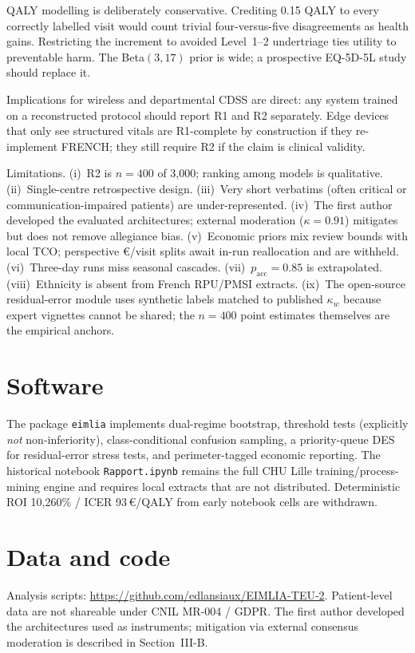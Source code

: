 \documentclass[conference]{IEEEtran}
\begin{document}
QALY modelling is deliberately conservative. Crediting 0.15 QALY to every correctly labelled visit would count trivial four-versus-five disagreements as health gains. Restricting the increment to avoided Level~1--2 undertriage ties utility to preventable harm. The Beta$(3,17)$ prior is wide; a prospective EQ-5D-5L study should replace it.

Implications for wireless and departmental CDSS are direct: any system trained on a reconstructed protocol should report R1 and R2 separately. Edge devices that only see structured vitals are R1-complete by construction if they re-implement FRENCH; they still require R2 if the claim is clinical validity.

Limitations. (i)~R2 is $n=400$ of 3{,}000; ranking among models is qualitative. (ii)~Single-centre retrospective design. (iii)~Very short verbatims (often critical or communication-impaired patients) are under-represented. (iv)~The first author developed the evaluated architectures; external moderation ($\kappa=0.91$) mitigates but does not remove allegiance bias. (v)~Economic priors mix review bounds with local TCO; perspective €/visit splits await in-run reallocation and are withheld. (vi)~Three-day runs miss seasonal cascades. (vii)~$p_{\mathrm{acc}}=0.85$ is extrapolated. (viii)~Ethnicity is absent from French RPU/PMSI extracts. (ix)~The open-source residual-error module uses synthetic labels matched to published $\kappa_w$ because expert vignettes cannot be shared; the $n=400$ point estimates themselves are the empirical anchors.

\section{Software}
The package \texttt{eimlia} implements dual-regime bootstrap, threshold tests (explicitly \emph{not} non-inferiority), class-conditional confusion sampling, a priority-queue DES for residual-error stress tests, and perimeter-tagged economic reporting. The historical notebook \texttt{Rapport.ipynb} remains the full CHU Lille training/process-mining engine and requires local extracts that are not distributed. Deterministic ROI 10{,}260\% / ICER 93\,€/QALY from early notebook cells are withdrawn.

\section*{Data and code}
Analysis scripts: \url{https://github.com/edlansiaux/EIMLIA-TEU-2}. Patient-level data are not shareable under CNIL MR-004 / GDPR. The first author developed the architectures used as instruments; mitigation via external consensus moderation is described in Section~III-B.
\end{document}
